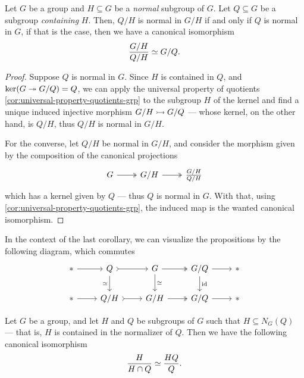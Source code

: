 \begin{corollary}
\label{cor:quotient-isomorphism}
Let \(G\) be a group and \(H \subseteq G\) be a \emph{normal} subgroup of
\(G\). Let \(Q \subseteq G\) be a subgroup \emph{containing} \(H\). Then,
\(Q/H\) is normal in \(G/H\) if and only if \(Q\) is normal in \(G\), if that is
the case, then we have a canonical isomorphism
\[
  \frac{G/H}{Q/H} \simeq G/Q.
\]
\end{corollary}

\begin{proof}
Suppose \(Q\) is normal in \(G\). Since \(H\) is contained in \(Q\), and
\(\ker(G \twoheadrightarrow G/Q) = Q\), we can apply the universal property of quotients
\cref{cor:universal-property-quotients-grp} to the subgroup \(H\) of the kernel
and find a unique induced injective morphism \(G/H \rightarrowtail G/Q\) --- whose kernel,
on the other hand, is \(Q/H\), thus \(Q/H\) is normal in \(G/H\).

For the converse, let \(Q/H\) be normal in \(G/H\), and consider the morphism
given by the composition of the canonical projections
\[
  \begin{tikzcd}
    G \ar[r, two heads] &G/H \ar[r, two heads] &\frac{G/H}{Q/H}
  \end{tikzcd}
\]
which has a kernel given by \(Q\) --- thus \(Q\) is normal in \(G\). With that,
using \cref{cor:universal-property-quotients-grp}, the induced map is the wanted
canonical isomorphism.
\end{proof}

In the context of the last corollary, we can visualize the propositions by the
following diagram, which commutes
\[
  \begin{tikzcd}
    * \ar[r] &Q \ar[r, tail] \ar[d, "\iso"']
    &G \ar[r, two heads] \ar[d, "\iso"]
    &G/Q \ar[r] \ar[d, "\Id"] &*
    \\
    * \ar[r] &Q/H \ar[r, tail] &G/H \ar[r, two heads] &G/Q \ar[r] &*
  \end{tikzcd}
\]

\begin{corollary}
\label{cor:grp-intersection-coset-isomorphism}
Let \(G\) be a group, and let \(H\) and \(Q\) be subgroups of \(G\) such that
\(H \subseteq N_G(Q)\) --- that is, \(H\) is contained in the normalizer of
\(Q\). Then we have the following canonical isomorphism
\[
  \frac{H}{H \cap Q} \simeq \frac{H Q}{Q}.
\]
\end{corollary}

